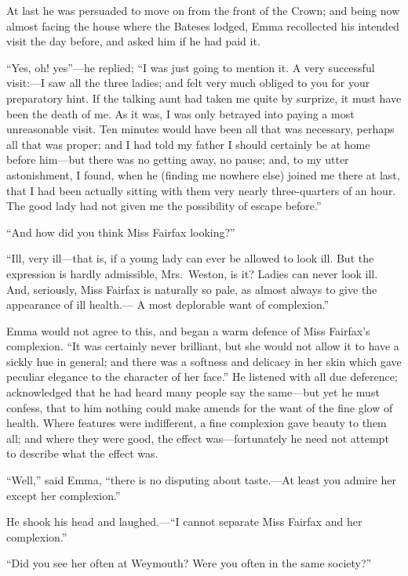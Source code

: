 At last he was persuaded to move on from the front of the Crown;
and being now almost facing the house where the Bateses lodged,
Emma recollected his intended visit the day before, and asked him
if he had paid it.

``Yes, oh! yes''---he replied; ``I was just going to mention it.
A very successful visit:---I saw all the three ladies; and felt very
much obliged to you for your preparatory hint.  If the talking aunt
had taken me quite by surprize, it must have been the death of me.
As it was, I was only betrayed into paying a most unreasonable visit.
Ten minutes would have been all that was necessary, perhaps all that
was proper; and I had told my father I should certainly be at home
before him---but there was no getting away, no pause; and, to my
utter astonishment, I found, when he (finding me nowhere else)
joined me there at last, that I had been actually sitting with them
very nearly three-quarters of an hour.  The good lady had not given me
the possibility of escape before.''

``And how did you think Miss Fairfax looking?''

``Ill, very ill---that is, if a young lady can ever be allowed to look ill.
But the expression is hardly admissible, Mrs.\ Weston, is it?
Ladies can never look ill.  And, seriously, Miss Fairfax is naturally
so pale, as almost always to give the appearance of ill health.---%
A most deplorable want of complexion.''

Emma would not agree to this, and began a warm defence of Miss
Fairfax's complexion.  ``It was certainly never brilliant, but she
would not allow it to have a sickly hue in general; and there was
a softness and delicacy in her skin which gave peculiar elegance
to the character of her face.''  He listened with all due deference;
acknowledged that he had heard many people say the same---but yet he
must confess, that to him nothing could make amends for the want
of the fine glow of health.  Where features were indifferent,
a fine complexion gave beauty to them all; and where they were good,
the effect was---fortunately he need not attempt to describe what the
effect was.

``Well,'' said Emma, ``there is no disputing about taste.---At least
you admire her except her complexion.''

He shook his head and laughed.---``I cannot separate Miss Fairfax
and her complexion.''

``Did you see her often at Weymouth?  Were you often in the same society?''

